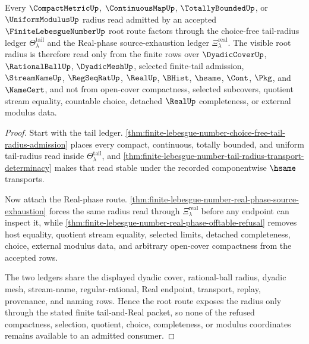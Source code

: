 \begin{theorem}
\label{thm:finite-lebesgue-number-root-radius-choice-free-tail-exhaustion}
Every $\CompactMetricUp$, $\ContinuousMapUp$, $\TotallyBoundedUp$, or $\UniformModulusUp$ radius read admitted by an accepted $\FiniteLebesgueNumberUp$ root route factors through the choice-free tail-radius ledger $\Theta_{\lambda}^{\mathrm{tail}}$ and the Real-phase source-exhaustion ledger $\Xi_{\lambda}^{\mathrm{real}}$. The visible root radius is therefore read only from the finite rows over $\DyadicCoverUp$, $\RationalBallUp$, $\DyadicMeshUp$, selected finite-tail admission, $\StreamNameUp$, $\RegSeqRatUp$, $\RealUp$, $\BHist$, $\hsame$, $\Cont$, $\Pkg$, and $\NameCert$, and not from open-cover compactness, selected subcovers, quotient stream equality, countable choice, detached $\RealUp$ completeness, or external modulus data.
\end{theorem}
\begin{proof}
Start with the tail ledger. \autoref{thm:finite-lebesgue-number-choice-free-tail-radius-admission} places every compact, continuous, totally bounded, and uniform tail-radius read inside $\Theta_{\lambda}^{\mathrm{tail}}$, and \autoref{thm:finite-lebesgue-number-tail-radius-transport-determinacy} makes that read stable under the recorded componentwise $\hsame$ transports.

Now attach the Real-phase route. \autoref{thm:finite-lebesgue-number-real-phase-source-exhaustion} forces the same radius read through $\Xi_{\lambda}^{\mathrm{real}}$ before any endpoint can inspect it, while \autoref{thm:finite-lebesgue-number-real-phase-offtable-refusal} removes host equality, quotient stream equality, selected limits, detached completeness, choice, external modulus data, and arbitrary open-cover compactness from the accepted rows.

The two ledgers share the displayed dyadic cover, rational-ball radius, dyadic mesh, stream-name, regular-rational, Real endpoint, transport, replay, provenance, and naming rows. Hence the root route exposes the radius only through the stated finite tail-and-Real packet, so none of the refused compactness, selection, quotient, choice, completeness, or modulus coordinates remains available to an admitted consumer.
\end{proof}

